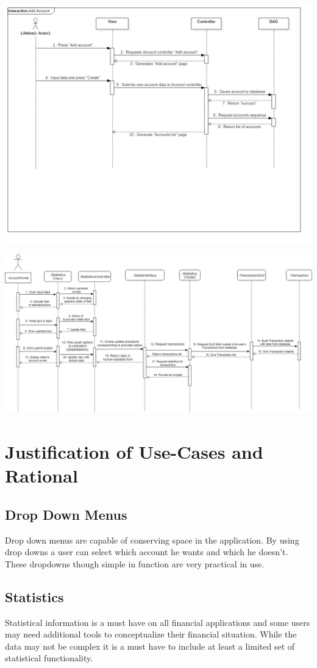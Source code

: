\documentclass[12pt]{article}
\begin{document}
\includegraphics[width=\graphicwidth]{Add_Account}

\includegraphics[width=\graphicwidth]{Statistics_Sequence}

\section{Justification of Use-Cases and Rational}
\subsection{Drop Down Menus}
	Drop down menus are capable of conserving space in the application. By using drop downs a user can select which account he wants and which he doesn't. These dropdowns though simple in function are very practical in use.
\subsection{Statistics}
	 Statistical information is a must have on all financial applications and some users may need additional tools to conceptualize their financial situation. While the data may not be complex it is a must have to include at least a limited set of statistical functionality.
\end{document}
